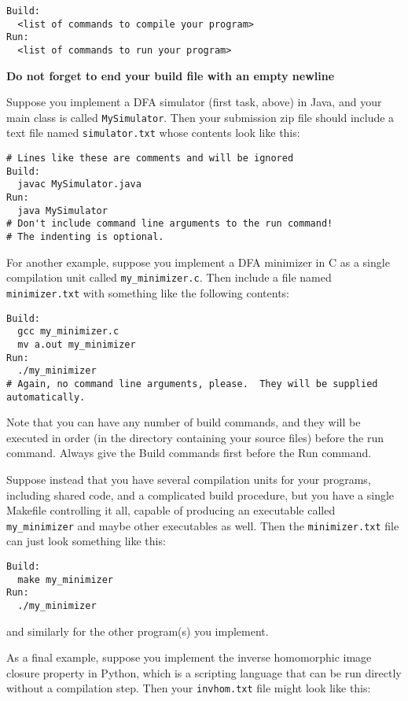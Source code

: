 \documentclass[11pt]{article}
\begin{document}
\begin{verbatim}
Build:
  <list of commands to compile your program>
Run:
  <list of commands to run your program>
\end{verbatim}

\textbf{Do not forget to end your build file with an empty newline}

Suppose you implement a DFA simulator (first task, above) in Java, and
your main class is called \texttt{MySimulator}.  Then your submission
zip file should include a text file named \texttt{simulator.txt} whose
contents look like this:

\begin{verbatim}
# Lines like these are comments and will be ignored
Build:
  javac MySimulator.java
Run:
  java MySimulator
# Don't include command line arguments to the run command!
# The indenting is optional.
\end{verbatim}
For another example, suppose you implement a DFA minimizer in C as a
single compilation unit called \texttt{my\_minimizer.c}.  Then include
a file named \texttt{minimizer.txt} with something like the following
contents:

\begin{verbatim}
Build:
  gcc my_minimizer.c
  mv a.out my_minimizer
Run:
  ./my_minimizer
# Again, no command line arguments, please.  They will be supplied automatically.
\end{verbatim}

Note that you can have any number of build commands, and they will be
executed in order (in the directory containing your source files)
before the run command.  Always give the Build commands first before
the Run command.

Suppose instead that you have several compilation units for your
programs, including shared code, and a complicated build procedure,
but you have a single Makefile controlling it all, capable of
producing an executable called \texttt{my\_minimizer} and maybe other
executables as well.  Then the \texttt{minimizer.txt} file can just
look something like this:

\begin{verbatim}
Build:
  make my_minimizer
Run:
  ./my_minimizer
\end{verbatim}

and similarly for the other program(s) you implement.

As a final example, suppose you implement the inverse homomorphic
image closure property in Python, which is a scripting language that
can be run directly without a compilation step.  Then your
\texttt{invhom.txt} file might look like this:
\end{document}
